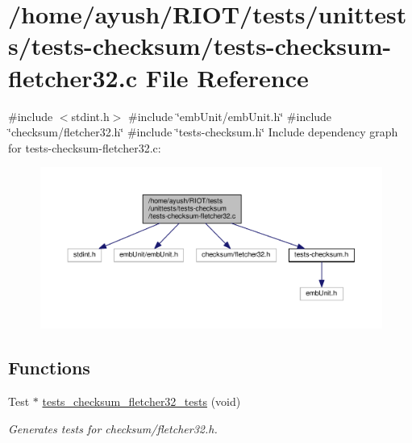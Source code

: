 \hypertarget{tests-checksum-fletcher32_8c}{}\section{/home/ayush/\+R\+I\+O\+T/tests/unittests/tests-\/checksum/tests-\/checksum-\/fletcher32.c File Reference}
\label{tests-checksum-fletcher32_8c}
{\ttfamily \#include $<$stdint.\+h$>$}\newline
{\ttfamily \#include \char`\"{}emb\+Unit/emb\+Unit.\+h\char`\"{}}\newline
{\ttfamily \#include \char`\"{}checksum/fletcher32.\+h\char`\"{}}\newline
{\ttfamily \#include \char`\"{}tests-\/checksum.\+h\char`\"{}}\newline
Include dependency graph for tests-\/checksum-\/fletcher32.c\+:
\nopagebreak
\begin{figure}[H]
\begin{center}
\leavevmode
\includegraphics[width=350pt]{tests-checksum-fletcher32_8c__incl}
\end{center}
\end{figure}
\subsection*{Functions}
\begin{DoxyCompactItemize}
\item 
Test $\ast$ \hyperlink{group__unittests_gaa0b18302e117209cfda9e5cdc7cd5af8}{tests\+\_\+checksum\+\_\+fletcher32\+\_\+tests} (void)
\begin{DoxyCompactList}\small\item\em Generates tests for checksum/fletcher32.\+h. \end{DoxyCompactList}\end{DoxyCompactItemize}

